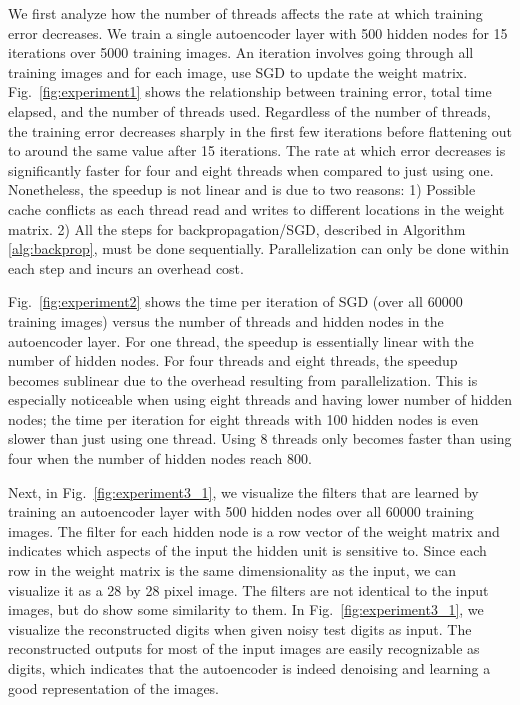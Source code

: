\documentclass[conference]{IEEEtran}
\begin{document}
We first analyze how the number of threads affects the rate at which training error decreases. We train a single autoencoder layer with 500 hidden nodes for 15 iterations over 5000 training images. An iteration involves going through all training images and for each image, use SGD to update the weight matrix. Fig.~\ref{fig:experiment1} shows the relationship between training error, total time elapsed, and the number of threads used. Regardless of the number of threads, the training error decreases sharply in the first few iterations before flattening out to around the same value after 15 iterations. The rate at which error decreases is significantly faster for four and eight threads when compared to just using one. Nonetheless, the speedup is not linear and is due to two reasons: 1) Possible cache conflicts as each thread read and writes to different locations in the weight matrix. 2) All the steps for backpropagation/SGD, described in Algorithm \ref{alg:backprop}, must be done sequentially. Parallelization can only be done within each step and incurs an overhead cost.

Fig.~\ref{fig:experiment2} shows the time per iteration of SGD (over all 60000 training images) versus the number of threads and hidden nodes in the autoencoder layer. For one thread, the speedup is essentially linear with the number of hidden nodes. For four threads and eight threads, the speedup becomes sublinear due to the overhead resulting from parallelization. This is especially noticeable when using eight threads and having lower number of hidden nodes; the time per iteration for eight threads with 100 hidden nodes is even slower than just using one thread. Using 8 threads only becomes faster than using four when the number of hidden nodes reach 800. 

Next, in Fig.~\ref{fig:experiment3_1}, we visualize the filters that are learned by training an autoencoder layer with 500 hidden nodes over all 60000 training images. The  filter for each hidden node is a row vector of the weight matrix and indicates which aspects of the input the hidden unit is sensitive to. Since each row in the weight matrix is the same dimensionality as the input, we can visualize it as a 28 by 28 pixel image. The filters are not identical to the input images, but do show some similarity to them. In Fig.~\ref{fig:experiment3_1}, we visualize the reconstructed digits when given noisy test digits as input. The reconstructed outputs for most of the input images are easily recognizable as digits, which indicates that the autoencoder is indeed denoising and learning a good representation of the images.
\end{document}
